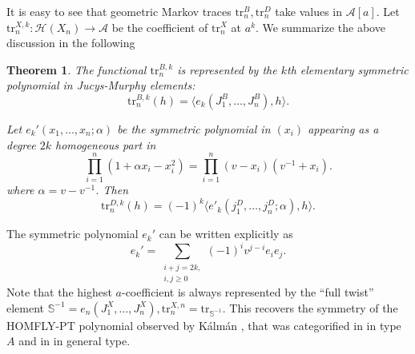 \documentclass[11pt,leqno]{article}
\newtheorem{theorem}{Theorem}[subsection]
\theoremstyle{definition}
\theoremstyle{definition}
\theoremstyle{remark}
\newcommand{\He}{\mathcal{H}}
\newcommand{\Se}{\mathbb{S}}
\newcommand{\tr}{\mathrm{tr}}
\begin{document}
It is easy to see that geometric Markov traces $\tr_n^B, \tr_n^D$ take values in $\mathcal{A}[a]$. Let $\tr_n^{X,k}:\He(X_n) \to \mathcal{A}$ be the coefficient of $\tr_n^X$ at $a^k$. We summarize the above discussion in the following
\begin{theorem}
  \label{sec:geom-mark-trac-1}
  The functional $\tr_n^{B,k}$ is represented by the $k$th elementary symmetric polynomial in Jucys-Murphy elements:
  \[
    \tr_n^{B,k}(h) = \langle e_k(J_1^B, \dots, J_n^B), h\rangle.
  \]

  Let $e_k'(x_1, \dots, x_n;\alpha)$ be the symmetric polynomial in $(x_i)$ appearing as a degree $2k$ homogeneous part in
  \[
    \prod_{i=1}^n(1 + \alpha x_i - x_i^2) = \prod_{i=1}^n(v-x_i)(v^{-1}+x_i).
  \]
  where $\alpha = v - v^{-1}$.
  Then
   \[
    \tr_n^{D,k}(h) = (-1)^k\langle e'_k(j_1^D, \dots, j_n^D; \alpha),h \rangle.
  \]
\end{theorem}
The symmetric polynomial $e_k'$ can be written explicitly as
\[
  e_k' = \sum_{\substack{i+j = 2k,\\ i,j\geq 0}}(-1)^{i}v^{j-i}e_ie_j.
\]
Note that the highest $a$-coefficient is always represented by the ``full twist'' element $\Se^{-1} = e_n(J_1^X, \dots, J_n^X), \tr_n^{X,n} = \tr_{\Se^{-1}}.$ This  recovers the symmetry of the HOMFLY-PT polynomial observed by K\'{a}lm\'{a}n \cite{kalmanMeridianTwistingClosed2009}, that was categorified in \cite{gorskySerreDualityKhovanov2019} in type $A$ and in \cite{bezrukavnikovMonodromicModelKhovanov2022} in general type.
\end{document}
